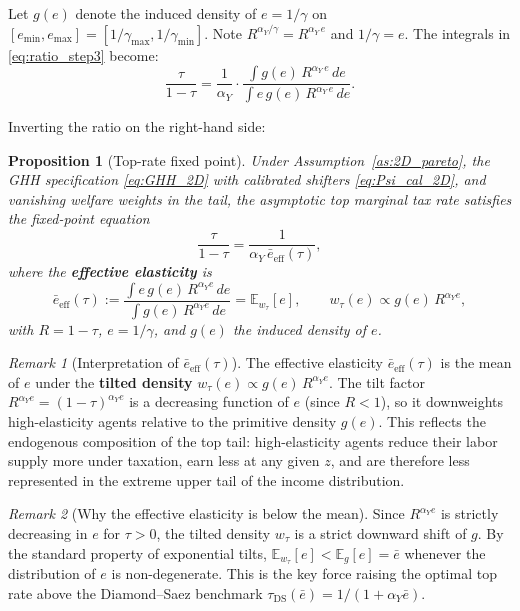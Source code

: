 \documentclass[12pt,a4paper]{article}
\theoremstyle{definition}
\theoremstyle{plain}
\newtheorem{proposition}{Proposition}[section]
\theoremstyle{remark}
\newtheorem{remark}{Remark}[section]
\newcommand{\E}{\mathbb{E}}
\begin{document}
Let $g(e)$ denote the induced density of $e = 1/\gamma$ on $[e_{\min},e_{\max}] = [1/\gamma_{\max},1/\gamma_{\min}]$.  Note $R^{\alpha_Y/\gamma} = R^{\alpha_Y\,e}$ and $1/\gamma = e$.  The integrals in \eqref{eq:ratio_step3} become:
\begin{equation}
\label{eq:ratio_final}
  \frac{\tau}{1-\tau} = \frac{1}{\alpha_Y}\cdot\frac{\displaystyle\int g(e)\,R^{\alpha_Y\,e}\,de}
  {\displaystyle\int e\,g(e)\,R^{\alpha_Y\,e}\,de}.
\end{equation}

Inverting the ratio on the right-hand side:

\begin{proposition}[Top-rate fixed point]
\label{prop:2D_top_rate}
Under Assumption~\ref{as:2D_pareto}, the GHH specification \eqref{eq:GHH_2D} with calibrated shifters \eqref{eq:Psi_cal_2D}, and vanishing welfare weights in the tail, the asymptotic top marginal tax rate satisfies the fixed-point equation
\begin{equation}
\label{eq:FOC_main_2D}
  \boxed{\frac{\tau}{1-\tau} = \frac{1}{\alpha_Y\,\bar{e}_{\mathrm{eff}}(\tau)},}
\end{equation}
where the \textbf{effective elasticity} is
\begin{equation}
\label{eq:e_eff_2D}
  \bar{e}_{\mathrm{eff}}(\tau) := \frac{\displaystyle\int e\,g(e)\,R^{\alpha_Y e}\,de}{\displaystyle\int g(e)\,R^{\alpha_Y e}\,de} = \E_{w_{\tau}}[e],
  \qquad w_{\tau}(e) \propto g(e)\,R^{\alpha_Y e},
\end{equation}
with $R = 1 - \tau$, $e = 1/\gamma$, and $g(e)$ the induced density of $e$.
\end{proposition}

\begin{remark}[Interpretation of $\bar{e}_{\mathrm{eff}}(\tau)$]
The effective elasticity $\bar{e}_{\mathrm{eff}}(\tau)$ is the mean of $e$ under the \textbf{tilted density} $w_{\tau}(e) \propto g(e)\,R^{\alpha_Y e}$.  The tilt factor $R^{\alpha_Y e} = (1-\tau)^{\alpha_Y e}$ is a decreasing function of $e$ (since $R < 1$), so it downweights high-elasticity agents relative to the primitive density $g(e)$.  This reflects the endogenous composition of the top tail: high-elasticity agents reduce their labor supply more under taxation, earn less at any given $z$, and are therefore less represented in the extreme upper tail of the income distribution.
\end{remark}

\begin{remark}[Why the effective elasticity is below the mean]
\label{rem:eff_below_mean}
Since $R^{\alpha_Y e}$ is strictly decreasing in $e$ for $\tau > 0$, the tilted density $w_{\tau}$ is a strict downward shift of $g$.  By the standard property of exponential tilts, $\E_{w_{\tau}}[e] < \E_g[e] = \bar{e}$ whenever the distribution of $e$ is non-degenerate.  This is the key force raising the optimal top rate above the Diamond--Saez benchmark $\tau_{\mathrm{DS}}(\bar{e}) = 1/(1+\alpha_Y\bar{e})$.
\end{remark}
\end{document}
